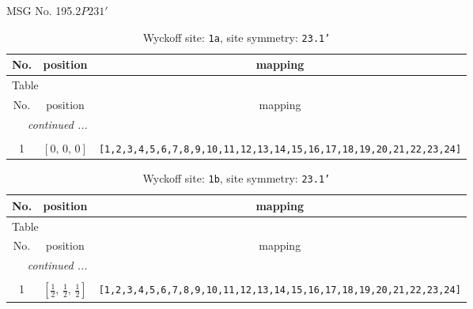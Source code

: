 \documentclass[fleqn,8pt]{jsarticle}
\begin{document}
\setcounter{MaxMatrixCols}{32}

\renewcommand{\tablename}{Table~}
\renewcommand{\figurename}{Figure~}
\begin{center}
\LARGE
MSG No. 195.2\quad$P231'$
\end{center}
\renewcommand{\arraystretch}{1.2}
\begin{longtable}{ccc}
\caption{Wyckoff site: {\tt 1a}, site symmetry: {\tt 23.1'}}
 \\
 \hline \hline
No. & position & mapping \\ \hline \endfirsthead

\multicolumn{2}{l}{\tablename\ \thetable{}} \\
 \hline \hline
No. & position & mapping \\ \hline \endhead

 \hline \hline
\multicolumn{2}{r}{\footnotesize\it continued ...} \\ \endfoot

 \hline \hline
\multicolumn{2}{r}{} \\ \endlastfoot

1 & $\left[ 0,\, 0,\, 0 \right]$ & {\tt [1,2,3,4,5,6,7,8,9,10,11,12,13,14,15,16,17,18,19,20,21,22,23,24]} \\
\end{longtable}
\renewcommand{\arraystretch}{1.2}
\begin{longtable}{ccc}
\caption{Wyckoff site: {\tt 1b}, site symmetry: {\tt 23.1'}}
 \\
 \hline \hline
No. & position & mapping \\ \hline \endfirsthead

\multicolumn{2}{l}{\tablename\ \thetable{}} \\
 \hline \hline
No. & position & mapping \\ \hline \endhead

 \hline \hline
\multicolumn{2}{r}{\footnotesize\it continued ...} \\ \endfoot

 \hline \hline
\multicolumn{2}{r}{} \\ \endlastfoot

1 & $\left[ \frac{1}{2},\, \frac{1}{2},\, \frac{1}{2} \right]$ & {\tt [1,2,3,4,5,6,7,8,9,10,11,12,13,14,15,16,17,18,19,20,21,22,23,24]} \\
\end{longtable}
\renewcommand{\arraystretch}{1.2}
\end{document}
